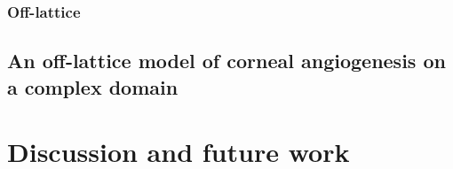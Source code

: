 \documentclass[superscriptaddress, a4paper]{article}
\begin{document}
\subsubsection{Off-lattice}
\label{sec:off-lattice vascular tumour growth}



\subsection{An off-lattice model of corneal angiogenesis on a complex domain}
\label{sec:an off-lattice model of corneal angiogenesis on a complex domain}



\section{Discussion and future work}
\label{sec:discussion and future work}
\end{document}
